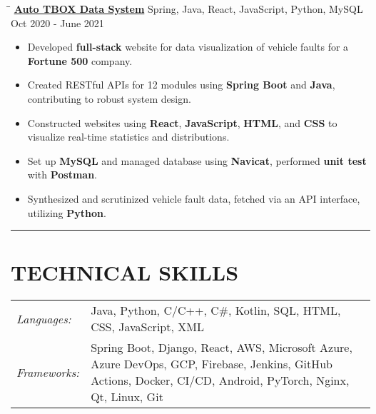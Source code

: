 \documentclass{res}
\begin{document}
\begin{resume}
    \vspace{-0.05in}	 
    \begin{tabbing}
    \hspace{2.3in}\= \hspace{3.45in}\= \kill %
    \href{https://github.com/DolorHunter/AutoTBOXDataSystem}{\bf Auto TBOX Data System}  \> 
                Spring, Java, React, JavaScript, Python, MySQL \> 
				Oct 2020 - June 2021
				\\
    \end{tabbing}\vspace{-20pt}      %
    \vspace{+0.1in}
    \begin{itemize} \itemsep 1.5pt %
        \item Developed {\bf full-stack} website for data visualization of vehicle faults for a {\bf Fortune 500} company.
        \item Created RESTful APIs for 12 modules using {\bf Spring Boot} and {\bf Java}, 
            contributing to robust system design.
        \item Constructed websites using {\bf React}, {\bf JavaScript}, {\bf HTML}, and {\bf CSS} 
            to visualize real-time statistics and distributions.    
        \item Set up {\bf MySQL} and managed database using {\bf Navicat}, 
            performed {\bf unit test} with {\bf Postman}.
        \item Synthesized and scrutinized vehicle fault data, fetched via an API interface, utilizing {\bf Python}.
    \end{itemize}

      
\vspace{-2pt}
\hspace{-0.65in}
\noindent\rule[0.25\baselineskip]{19.36cm}{0.5pt}    

\vspace{-0.2in}
\section{TECHNICAL SKILLS}  
    \vspace{+0.1in}
    \hspace{-0.12in} 
    \begin{tabular}{l p{5.5in}}
    \rule{0in}{0.2in}
    {\sl Languages:} & Java, Python, C/C++, C\#, Kotlin, SQL, HTML, CSS, JavaScript, XML \\
    \rule{0in}{0.2in}
    {\sl Frameworks:} & Spring Boot, Django, React, AWS, Microsoft Azure, Azure DevOps, GCP, Firebase, 
                        Jenkins, GitHub Actions, Docker, CI/CD, Android, PyTorch, Nginx, Qt, Linux, Git
    \end{tabular}   
    
\end{resume}
\end{document}
